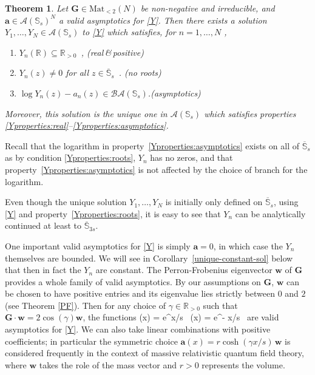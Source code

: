 \documentclass[12pt]{article}
\theoremstyle{plain}
\newtheorem{theorem}{Theorem}
\theoremstyle{definition}
\numberwithin{equation}{section}
\numberwithin{theorem}{section}
\def\be#1\ee{\begin{equation}#1\end{equation}}
\renewcommand{\vec}[1]{\mathbf{#1}}
\begin{document}
\begin{theorem}\label{main-theorem-Y}
Let $\vec{G}\in\mathrm{Mat}_{<2}(N)$ be non-negative and irreducible, and $\vec{a}\in\mathcal{A}(\mathbb{S}_s)^N$ a valid asymptotics for \eqref{Y}.
Then there exists a solution
$Y_1,\dots,Y_N \in \mathcal{A}(\mathbb{S}_s)$ to \eqref{Y} which satisfies, for $n=1,\dots,N$ ,
\begin{enumerate}
\item \label{Yproperties:real}
$Y_n(\mathbb{R})\subseteq\mathbb{R}_{>0}$~,
 \hfill\emph{(real\,\&\,positive)}
\item \label{Yproperties:roots} $Y_n(z)\neq 0$ for all $z\in\overline{\mathbb{S}}_s$~.
\hfill\emph{(no roots)}
\item \label{Yproperties:asymptotics}
$ \log Y_n(z)-a_n(z) \in\mathcal{BA}(\mathbb{S}_s)$.\hfill\emph{(asymptotics)}
\end{enumerate}
Moreover, this solution is the unique one in $\mathcal{A}(\mathbb{S}_s)$ which satisfies properties \ref{Yproperties:real}--\ref{Yproperties:asymptotics}.
\end{theorem}


	Recall that the logarithm in property~\ref{Yproperties:asymptotics} exists on all of $\overline{\mathbb{S}}_s$ as by condition \ref{Yproperties:roots}, $Y_n$ has no zeros, and that property~\ref{Yproperties:asymptotics} is not affected by the choice of branch for the logarithm.

Even though the unique solution $Y_1,\dots,Y_N$ is initially only defined on $\overline{\mathbb{S}}_s$, using \eqref{Y} and property~\ref{Yproperties:roots}, it is easy to see that $Y_n$ can be analytically continued at least to $\overline{\mathbb{S}}_{3s}$.


\medskip


	One important valid asymptotics for \eqref{Y} is simply $\vec{a}=0$,
 in which case the $Y_n$ themselves are bounded. We will see in Corollary~\ref{unique-constant-sol} below that then in fact the $Y_n$ are constant. 
The Perron-Frobenius eigenvector $\vec{w}$ of $\vec{G}$ provides a whole family of valid asymptotics.
By our assumptions on $\vec G$, $\vec{w}$ can be chosen to have positive entries and its eigenvalue lies strictly between $0$ and $2$
(see Theorem \ref{PF}).
Then for any choice of $\gamma \in \mathbb{R}_{>0}$ such that $\vec{G}\cdot\vec{w} = 2 \cos(\gamma) \vec{w}$, the functions
\be \label{asymptoticexample}
	\vec{a}(x) = e^{\gamma x/s} \, \vec{w} 
	\qquad {} \qquad
	\vec{a}(x) = e^{- \gamma x/s} \, \vec{w} 
\ee
	are valid asymptotics for \eqref{Y}.
We can also take linear combinations with positive coefficients; in particular the symmetric choice
$\vec{a}(x) = r \cosh(\gamma x/s) \, \vec{w}$ 
is considered frequently in the context of massive relativistic quantum field theory, where $\vec{w}$ takes the role of the mass vector
and $r>0$ represents the volume.
\end{document}

